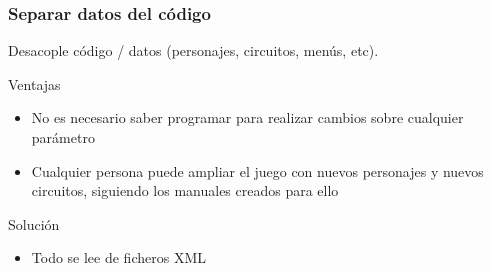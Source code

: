 \begin{frame}
    \frametitle{Separar datos del código}

        Desacople código / datos (personajes, circuitos, menús, etc).\\
        \begin{block}{Ventajas}
            \begin{itemize}
                \item No es necesario saber programar para realizar cambios sobre cualquier parámetro
                \item Cualquier persona puede ampliar el juego con nuevos personajes y nuevos circuitos, siguiendo
                los manuales creados para ello
            \end{itemize}
        \end{block}
        \begin{block}{Solución}
            \begin{itemize}
                \item Todo se lee de ficheros XML
            \end{itemize}
        \end{block}

\end{frame}

